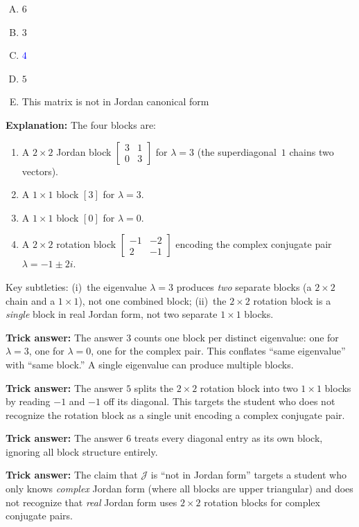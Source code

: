 \documentclass[12pt]{amsart}
\begin{document}
\begin{enumerate}[(A)]
\item $6$
\item $3$
\item \textcolor{blue}{\textbf{$4$}}
\item $5$
\item This matrix is not in Jordan canonical form
\end{enumerate}

\textbf{Explanation:}
The four blocks are:
\begin{enumerate}
\item A $2 \times 2$ Jordan block $\begin{bmatrix} 3 & 1 \\ 0 & 3 \end{bmatrix}$
      for $\lambda = 3$ (the superdiagonal~$1$ chains two vectors).
\item A $1 \times 1$ block $[3]$ for $\lambda = 3$.
\item A $1 \times 1$ block $[0]$ for $\lambda = 0$.
\item A $2 \times 2$ rotation block
      $\begin{bmatrix} -1 & -2 \\ 2 & -1 \end{bmatrix}$ encoding
      the complex conjugate pair $\lambda = -1 \pm 2i$.
\end{enumerate}
Key subtleties: (i)~the eigenvalue $\lambda = 3$ produces \emph{two}
separate blocks (a $2 \times 2$ chain and a $1 \times 1$), not one
combined block; (ii)~the $2 \times 2$ rotation block is a \emph{single}
block in real Jordan form, not two separate $1 \times 1$ blocks.

\textbf{Trick answer:}
The answer $3$ counts one block per distinct eigenvalue: one for
$\lambda = 3$, one for $\lambda = 0$, one for the complex pair. This
conflates ``same eigenvalue'' with ``same block.'' A single eigenvalue
can produce multiple blocks.

\textbf{Trick answer:}
The answer $5$ splits the $2 \times 2$ rotation block into two
$1 \times 1$ blocks by reading $-1$ and $-1$ off its diagonal. This
targets the student who does not recognize the rotation block as a
single unit encoding a complex conjugate pair.

\textbf{Trick answer:}
The answer $6$ treats every diagonal entry as its own block, ignoring all
block structure entirely.

\textbf{Trick answer:}
The claim that $\mathcal{J}$ is ``not in Jordan form'' targets a student
who only knows \emph{complex} Jordan form (where all blocks are upper
triangular) and does not recognize that \emph{real} Jordan form uses
$2 \times 2$ rotation blocks for complex conjugate pairs.
\end{document}
